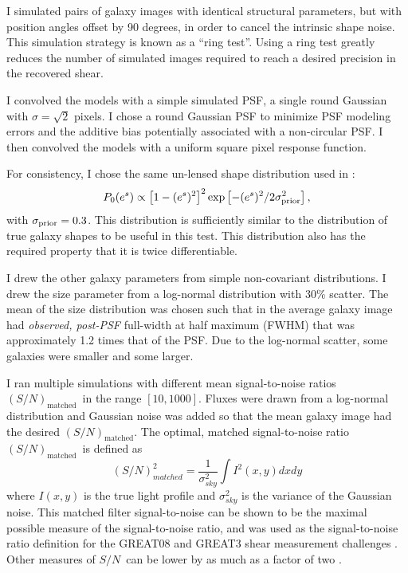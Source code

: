 \documentclass[usegraphicx,usenatbib]{mn2e}
\newcommand{\sn}{$S/N$}
\newcommand{\Msn}{$(S/N)_{\textrm{matched}}$}
\newcommand{\lognormscatt}{30}
\begin{document}
I simulated pairs of galaxy images with identical structural parameters, but
with position angles offset by 90 degrees, in order to cancel the intrinsic
shape noise.  This simulation strategy is known as a ``ring
test''\citep{Nakajima2007}. Using a ring test greatly reduces the number of
simulated images required to reach a desired precision in the recovered shear.

I convolved the models with a simple simulated PSF, a single round Gaussian
with $\sigma = \sqrt{2}$ pixels.  I chose a round Gaussian PSF to minimize PSF
modeling errors and the additive bias potentially associated with a
non-circular PSF.  I then convolved the models with a uniform square pixel
response function.


For consistency, I chose the same un-lensed shape distribution
used in \cite{ba14}:
\begin{equation}
P_0(e^s)\propto \left[1-(e^s)^2\right]^2 \exp\left[-(e^s)^2/2\sigma_{\rm prior}^2\right],
\end{equation}
with $\sigma_{\rm prior}=0.3$. This distribution is sufficiently similar to the
distribution of true galaxy shapes to be useful in this test.  This
distribution also has the required property that it is twice differentiable.

I drew the other galaxy parameters from simple non-covariant distributions.  I
drew the size parameter from a log-normal distribution with \lognormscatt\%
scatter.  The mean of the size distribution was chosen such that in the average
galaxy image had {\it observed, post-PSF} full-width at half maximum (FWHM)
that was approximately 1.2 times that of the PSF.  Due to the log-normal
scatter, some galaxies were smaller and some larger.

I ran multiple simulations with different mean signal-to-noise ratios \Msn\ in the
range $[10,1000]$.  Fluxes were drawn from a log-normal distribution and
Gaussian noise was added so that the mean galaxy image had the desired 
\Msn.  The optimal, matched signal-to-noise ratio \Msn\ is defined as
\begin{equation}
    (S/N)^2_{matched} = \frac{1}{\sigma^2_{sky}} \int I^2(x,y) dx dy
\end{equation}
where $I(x,y)$ is the true light profile and $\sigma_{sky}^2$ is the variance
of the Gaussian noise.  This matched filter signal-to-noise can be shown to be
the maximal possible measure of the signal-to-noise ratio, and was used as the
signal-to-noise ratio definition for the GREAT08 and GREAT3 shear measurement
challenges \citep{BridleGREAT08,great3}.  Other measures of \sn\ can be lower
by as much as a factor of two \citep{great3}.
\end{document}
